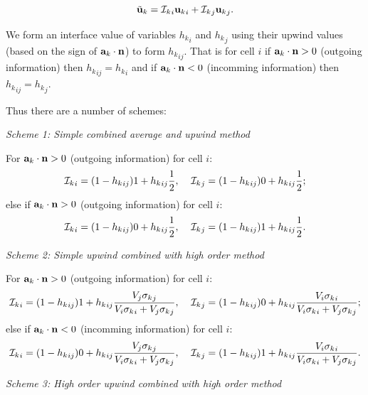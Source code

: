 \begin{equation}
{\tilde{\bf u}_k} = {{\cal I}_k}_i  {{\bf u}_k}_i + {{\cal I}_k}_j {{\bf u}_k}_j. 
\end{equation} 

We form an interface value of variables ${h_k}_{i}$ and ${h_k}_{j}$ using their upwind values (based on the sign of 
${\bf a}_k\cdot {\bf n}$) to form ${h_k}_{ij}$. That is for cell $i$ if ${\bf a}_k\cdot {\bf n}>0$ (outgoing information) 
then 
${h_k}_{ij}= {h_k}_{i}$ and if ${\bf a}_k\cdot {\bf n}<0$ (incomming information) then
${h_k}_{ij}= {h_k}_{j}$.   

Thus  there are a number of schemes:

\noindent
{\it Scheme 1: Simple combined average and upwind method} 

\noindent
For ${\bf a}_k\cdot {\bf n}>0$ (outgoing information) for cell $i$: 
\begin{equation}
{{\cal I}_k}_i = (1-{h_k}_{ij}) 1 + {h_k}_{ij}\frac{1}{2},   \;\;\;\; 
{{\cal I}_k}_j = (1-{h_k}_{ij}) 0 + {h_k}_{ij}\frac{1}{2};
\end{equation} 
else if ${\bf a}_k\cdot {\bf n}>0$ (outgoing information) for cell $i$: 
\begin{equation}
{{\cal I}_k}_i = (1-{h_k}_{ij}) 0 + {h_k}_{ij}\frac{1}{2},   \;\;\;\; 
{{\cal I}_k}_j = (1-{h_k}_{ij}) 1 + {h_k}_{ij}\frac{1}{2}.   
\end{equation} 


\vspace{1cm}
\noindent
{\it Scheme 2: Simple upwind combined with high order method} 

\noindent
For ${\bf a}_k\cdot {\bf n}>0$ (outgoing information) for cell $i$: 
\begin{equation}
{{\cal I}_k}_i = (1-{h_k}_{ij}) 1 + {h_k}_{ij}\frac{ V_j{\sigma_k}_j }{ V_i{\sigma_k}_i + V_j{\sigma_k}_j },  \;\;\;\; 
{{\cal I}_k}_j = (1-{h_k}_{ij}) 0 + {h_k}_{ij}\frac{ V_i{\sigma_k}_i }{ V_i{\sigma_k}_i + V_j{\sigma_k}_j };
\end{equation} 
else if ${\bf a}_k\cdot {\bf n}<0$ (incomming information) for cell $i$:
\begin{equation}
{{\cal I}_k}_i = (1-{h_k}_{ij}) 0 + {h_k}_{ij}\frac{ V_j{\sigma_k}_j }{ V_i{\sigma_k}_i + V_j{\sigma_k}_j },  \;\;\;\; 
{{\cal I}_k}_j = (1-{h_k}_{ij}) 1 + {h_k}_{ij}\frac{ V_i{\sigma_k}_i }{ V_i{\sigma_k}_i + V_j{\sigma_k}_j }.   
\end{equation} 

\vspace{1cm}
\noindent
{\it Scheme 3: High order upwind combined with high order method} 


